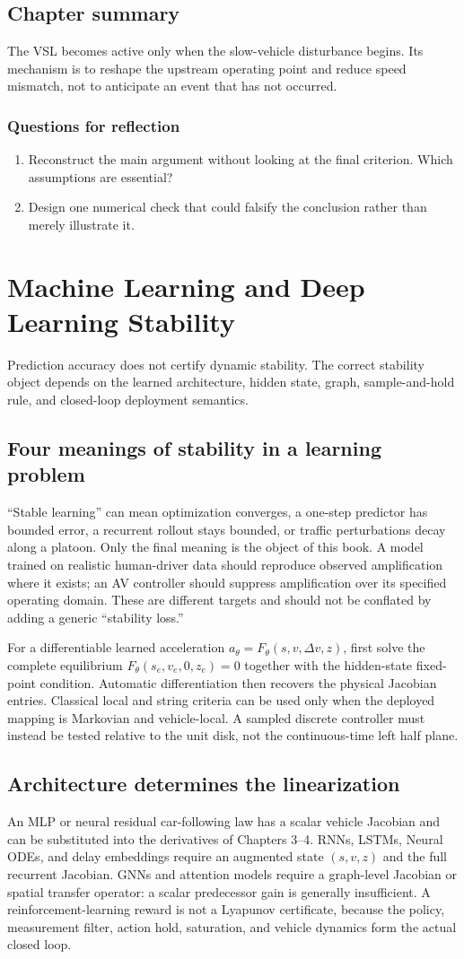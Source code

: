 \documentclass[11pt,a4paper,openany]{book}
\numberwithin{equation}{chapter}
\numberwithin{figure}{chapter}
\numberwithin{table}{chapter}
\newcommand{\chapterguide}[1]{\begin{tcolorbox}[keybox,title=Chapter guide]#1\end{tcolorbox}}
\newcommand{\chapterend}[1]{\section*{Chapter summary}\addcontentsline{toc}{section}{Chapter summary}\begin{tcolorbox}[resultbox]#1\end{tcolorbox}\subsection*{Questions for reflection}\begin{enumerate}[leftmargin=1.7em]\item Reconstruct the main argument without looking at the final criterion. Which assumptions are essential?\item Design one numerical check that could falsify the conclusion rather than merely illustrate it.\end{enumerate}\clearpage}
\begin{document}
\chapterend{The VSL becomes active only when the slow-vehicle disturbance begins. Its mechanism is to reshape the upstream operating point and reduce speed mismatch, not to anticipate an event that has not occurred.}

\chapter{Machine Learning and Deep Learning Stability}
\chapterguide{Prediction accuracy does not certify dynamic stability. The correct stability object depends on the learned architecture, hidden state, graph, sample-and-hold rule, and closed-loop deployment semantics.}

\section{Four meanings of stability in a learning problem}
``Stable learning'' can mean optimization converges, a one-step predictor has bounded error, a recurrent rollout stays bounded, or traffic perturbations decay along a platoon. Only the final meaning is the object of this book. A model trained on realistic human-driver data should reproduce observed amplification where it exists; an AV controller should suppress amplification over its specified operating domain. These are different targets and should not be conflated by adding a generic ``stability loss.''

For a differentiable learned acceleration $a_\theta=F_\theta(s,v,\Delta v,z)$, first solve the complete equilibrium $F_\theta(s_e,v_e,0,z_e)=0$ together with the hidden-state fixed-point condition. Automatic differentiation then recovers the physical Jacobian entries. Classical local and string criteria can be used only when the deployed mapping is Markovian and vehicle-local. A sampled discrete controller must instead be tested relative to the unit disk, not the continuous-time left half plane.

\section{Architecture determines the linearization}
An MLP or neural residual car-following law has a scalar vehicle Jacobian and can be substituted into the derivatives of Chapters 3--4. RNNs, LSTMs, Neural ODEs, and delay embeddings require an augmented state $(s,v,z)$ and the full recurrent Jacobian. GNNs and attention models require a graph-level Jacobian or spatial transfer operator: a scalar predecessor gain is generally insufficient. A reinforcement-learning reward is not a Lyapunov certificate, because the policy, measurement filter, action hold, saturation, and vehicle dynamics form the actual closed loop.
\end{document}
